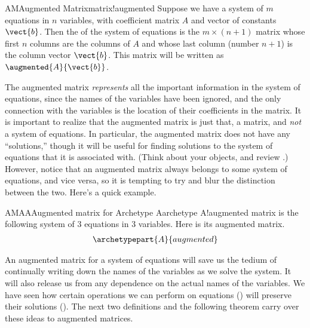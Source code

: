 %
\begin{definition}{AM}{Augmented Matrix}{matrix!augmented}
Suppose we have a system of $m$ equations in $n$ variables, with coefficient matrix $A$ and vector of constants $\vect{b}$.  Then the  of the system of equations is the $m\times(n+1)$ matrix whose first $n$ columns are the columns of $A$ and whose last column (number $n+1$) is the column vector $\vect{b}$.  This matrix will be written as $\augmented{A}{\vect{b}}$.
\end{definition}
%
The augmented matrix {\em represents} all the important information in the system of equations, since the names of the variables have been ignored, and the only connection with the variables is the location of their coefficients in the matrix.  It is important to realize that the augmented matrix is just that, a matrix, and {\em not} a system of equations.  In particular, the augmented matrix does not have any ``solutions,'' though it will be useful for finding solutions to the system of equations that it is associated with.  (Think about your objects, and review .)  However, notice that an augmented matrix always belongs to some system of equations, and vice versa, so it is tempting to try and blur the distinction between the two.  Here's a quick example.
%
\begin{example}{AMAA}{Augmented matrix for Archetype A}{archetype A!augmented matrix}
 is the following system of 3 equations in 3 variables.
Here is its augmented matrix.
\begin{align*}
\archetypepart{A}{augmented}
\end{align*}
\end{example}
%
%
%
An augmented matrix for a system of equations will save us the tedium of continually writing down the names of the variables as we solve the system.  It will also release us from any dependence on the actual names of the variables.  We have seen how certain operations we can perform on equations () will preserve their solutions ().  The next two definitions and the following theorem carry over these ideas to augmented matrices.
%
